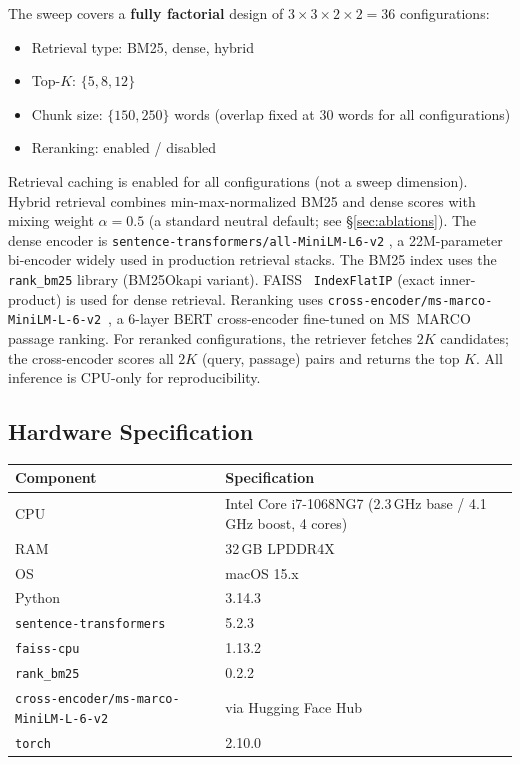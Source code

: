 \documentclass[11pt,a4paper]{article}
\begin{document}
The sweep covers a \textbf{fully factorial} design of
$3 \times 3 \times 2 \times 2 = 36$ configurations:
\begin{itemize}[leftmargin=*,topsep=2pt,itemsep=1pt]
  \item Retrieval type: BM25, dense, hybrid
  \item Top-$K$: $\{5, 8, 12\}$
  \item Chunk size: $\{150, 250\}$ words (overlap fixed at 30 words for all
        configurations)
  \item Reranking: enabled / disabled
\end{itemize}
Retrieval caching is enabled for all configurations (not a sweep dimension).
Hybrid retrieval combines min-max-normalized BM25 and dense scores with mixing
weight $\alpha = 0.5$ (a standard neutral default; see \S\ref{sec:ablations}).
The dense encoder is \texttt{sentence-transformers/all-MiniLM-L6-v2}
\citep{reimers2019sbert}, a 22M-parameter bi-encoder widely used in production
retrieval stacks.
The BM25 index uses the \texttt{rank\_bm25} library (BM25Okapi variant).
FAISS~\citep{johnson2019faiss} \texttt{IndexFlatIP} (exact inner-product) is
used for dense retrieval.
Reranking uses \texttt{cross-encoder/ms-marco-MiniLM-L-6-v2}~\citep{nogueira2019passage},
a 6-layer BERT cross-encoder fine-tuned on MS~MARCO passage ranking.
For reranked configurations, the retriever fetches $2K$ candidates; the
cross-encoder scores all $2K$ (query, passage) pairs and returns the top $K$.
All inference is CPU-only for reproducibility.

\subsection{Hardware Specification}
\label{sec:hardware}

\begin{center}
\small
\begin{tabular}{lp{7cm}}
\toprule
Component & Specification \\
\midrule
CPU & Intel Core i7-1068NG7 (2.3\,GHz base / 4.1\,GHz boost, 4 cores) \\
RAM & 32\,GB LPDDR4X \\
OS  & macOS 15.x \\
Python & 3.14.3 \\
\texttt{sentence-transformers} & 5.2.3 \\
\texttt{faiss-cpu} & 1.13.2 \\
\texttt{rank\_bm25} & 0.2.2 \\
\texttt{cross-encoder/ms-marco-MiniLM-L-6-v2} & via Hugging Face Hub \\
\texttt{torch} & 2.10.0 \\
\bottomrule
\end{tabular}
\end{center}
\end{document}
